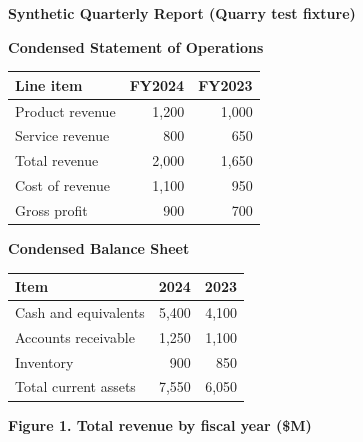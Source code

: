\documentclass[11pt]{article}
\begin{document}
\begin{center}\Large\textbf{Synthetic Quarterly Report (Quarry test fixture)}\end{center}
\vspace{1em}

\noindent\textbf{Condensed Statement of Operations}\\[0.5em]
\begin{tabular}{|p{5cm}|R|R|}
\hline
Line item & FY2024 & FY2023 \\
\hline
Product revenue & 1,200 & 1,000 \\
\hline
Service revenue & 800 & 650 \\
\hline
Total revenue & 2,000 & 1,650 \\
\hline
Cost of revenue & 1,100 & 950 \\
\hline
Gross profit & 900 & 700 \\
\hline
\end{tabular}

\vspace{2em}

\noindent\textbf{Condensed Balance Sheet}\\[0.5em]
\begin{tabular}{|p{5cm}|R|R|}
\hline
Item & 2024 & 2023 \\
\hline
Cash and equivalents & 5,400 & 4,100 \\
\hline
Accounts receivable & 1,250 & 1,100 \\
\hline
Inventory & 900 & 850 \\
\hline
Total current assets & 7,550 & 6,050 \\
\hline
\end{tabular}

\vspace{2em}

\noindent\textbf{Figure 1. Total revenue by fiscal year (\$M)}\\[0.5em]
\end{document}
